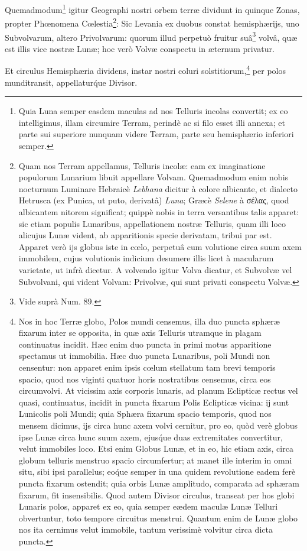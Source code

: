 \documentclass[a4paper, 11pt, oneside, polutonikogreek, german]{article}
\begin{document}
Quemadmodum\footnote{Quia Luna semper easdem maculas ad nos Telluris incolas convertit; ex eo intelligimus, illam circumire Terram, perindè ac si filo esset illi annexa; et parte sui superiore nunquam videre Terram, parte seu hemisphærio inferiori semper.} igitur Geographi nostri orbem terræ dividunt in quinque Zonas, propter Phœnomena Cœlestia\footnote{Quam nos Terram appellamus, Telluris incolæ: eam ex imaginatione populorum Lunarium libuit appellare Volvam. Quemadmodum enim nobis nocturnum Luminare Hebraicè \emph{Lebhana} dicitur à colore albicante, et dialecto Hetrusca (ex Punica, ut puto, derivatâ) \emph{Luna}; Græcè \emph{Selene} à σέλας, quod albicantem nitorem significat; quippè nobis in terra versantibus talis apparet: sic etiam populis Lunaribus, appellationem nostræ Telluris, quam illi loco alicujus Lunæ vident, ab apparitionis specie derivatam, tribui par est. Apparet verò ijs globus iste in cœlo, perpetuâ cum volutione circa suum axem immobilem, cujus volutionis indicium desumere illis licet à macularum varietate, ut infrà dicetur. A volvendo igitur Volva dicatur, et Subvolvæ vel Subvolvani, qui vident Volvam: Privolvæ, qui sunt privati conspectu Volvæ.}: Sic Levania ex duobus constat hemisphærijs, uno Subvolvarum, altero Privolvarum: quorum illud perpetuò fruitur suâ\footnote{Vide suprà Num. 89.} volvâ, quæ est illis vice nostræ Lunæ; hoc verò Volvæ conspectu in æternum privatur.

Et circulus Hemisphæria dividens, instar nostri coluri solstitiorum,\footnote{Nos in hoc Terræ globo, Polos mundi censemus, illa duo puncta sphæræ fixarum inter se opposita, in quæ axis Telluris utramque in plagam continuatus incidit. Hæc enim duo puncta in primi motus apparitione spectamus ut immobilia. Hæc duo puncta Lunaribus, poli Mundi non censentur: non apparet enim ipsis cœlum stellatum tam brevi temporis spacio, quod nos viginti quatuor horis nostratibus censemus, circa eos circumvolvi. At vicissim axis corporis lunaris, ad planum Eclipticæ rectus vel quasi, continuatus, incidit in puncta fixarum Polis Eclipticæ vicina: ij sunt Lunicolis poli Mundi; quia Sphæra fixarum spacio temporis, quod nos mensem dicimus, ijs circa hunc axem volvi cernitur, pro eo, quòd verè globus ipse Lunæ circa hunc suum axem, ejus\'que duas extremitates convertitur, velut immobiles loco. Etsi enim Globus Lunæ, et in eo, hic etiam axis, circa globum telluris menstruo spacio circumfertur; at manet ille interim in omni situ, sibi ipsi parallelus; eo\'que semper in una quidem revolutione eadem ferè puncta fixarum ostendit; quia orbis Lunæ amplitudo, comparata ad sphæram fixarum, fit insensibilis. Quod autem Divisor circulus, transeat per hos globi Lunaris polos, apparet ex eo, quia semper eædem maculæ Lunæ Telluri obvertuntur, toto tempore circuitus menstrui. Quantum enim de Lunæ globo nos ita cernimus velut immobile, tantum verissimè volvitur circa dicta puncta.} per polos munditransit, appellatur\'que Divisor.
\end{document}
